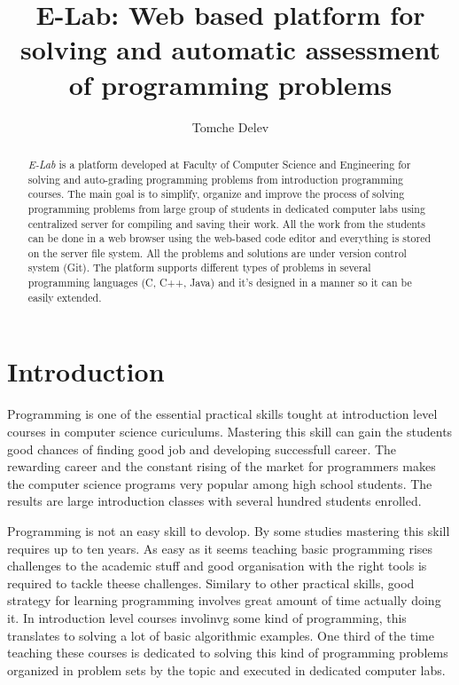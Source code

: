 \documentclass{article}
\begin{document}
\title{E-Lab: Web based platform for solving and automatic assessment of
programming problems}

\author{Tomche Delev}

\maketitle

\begin{abstract}

\emph{E-Lab} is a platform developed at Faculty of Computer Science and
Engineering for solving and auto-grading programming problems from introduction
programming courses. The main goal is to simplify, organize and
improve the process of solving programming problems from large group of
students in dedicated computer labs using centralized server for compiling and saving their
work. All the work from the students can be done in a web browser using the
web-based code editor and everything is stored on the server file system.
All the problems and solutions are under version control system (Git). The
platform supports different types of problems in several programming languages
(C, C++, Java) and it's designed in a manner so it can be easily extended.
\end{abstract}

\section{Introduction}
Programming is one of the essential practical skills tought at introduction
level courses in computer science curiculums. Mastering this skill can gain the
students good chances of finding good job and developing successfull career. The
rewarding career and the constant rising of the market for programmers makes the
computer science programs very popular among high school students. The results
are large introduction classes with several hundred students enrolled. 

Programming is not an easy skill to devolop. By some studies
\cite{winslow1996programming} mastering this skill requires up to ten years. As
easy as it seems teaching basic programming rises challenges to the academic
stuff and good organisation with the right tools is required to tackle theese
challenges. Similary to other practical skills, good strategy for learning
programming involves great amount of time actually doing it. In introduction
level courses involinvg some kind of programming, this translates to solving a
lot of basic algorithmic examples. One third of the time teaching these courses
is dedicated to solving this kind of programming problems organized in problem sets by the
topic and executed in dedicated computer labs.
\end{document}
